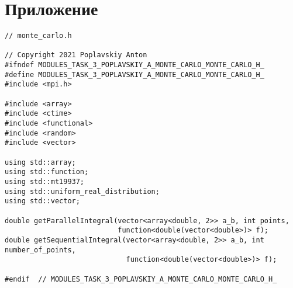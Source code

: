 \documentclass{report}
\begin{document}
\section*{Приложение}
\begin{lstlisting}
// monte_carlo.h

// Copyright 2021 Poplavskiy Anton
#ifndef MODULES_TASK_3_POPLAVSKIY_A_MONTE_CARLO_MONTE_CARLO_H_
#define MODULES_TASK_3_POPLAVSKIY_A_MONTE_CARLO_MONTE_CARLO_H_
#include <mpi.h>

#include <array>
#include <ctime>
#include <functional>
#include <random>
#include <vector>

using std::array;
using std::function;
using std::mt19937;
using std::uniform_real_distribution;
using std::vector;

double getParallelIntegral(vector<array<double, 2>> a_b, int points,
                           function<double(vector<double>)> f);
double getSequentialIntegral(vector<array<double, 2>> a_b, int number_of_points,
                             function<double(vector<double>)> f);

#endif  // MODULES_TASK_3_POPLAVSKIY_A_MONTE_CARLO_MONTE_CARLO_H_

\end{lstlisting}
\end{document}
